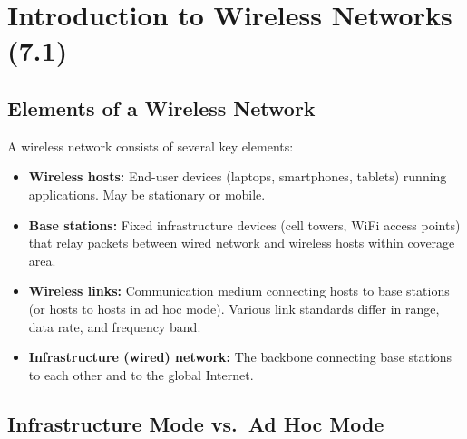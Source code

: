 \section{Introduction to Wireless Networks (7.1)}

\subsection{Elements of a Wireless Network}

\begin{keybox}
A wireless network consists of several key elements:
\begin{itemize}[noitemsep]
    \item \textbf{Wireless hosts:} End-user devices (laptops, smartphones, tablets) running applications. May be stationary or mobile.
    \item \textbf{Base stations:} Fixed infrastructure devices (cell towers, WiFi access points) that relay packets between wired network and wireless hosts within coverage area.
    \item \textbf{Wireless links:} Communication medium connecting hosts to base stations (or hosts to hosts in ad hoc mode). Various link standards differ in range, data rate, and frequency band.
    \item \textbf{Infrastructure (wired) network:} The backbone connecting base stations to each other and to the global Internet.
\end{itemize}
\end{keybox}

\begin{imagebox}
\end{imagebox}

\subsection{Infrastructure Mode vs.\ Ad Hoc Mode}

